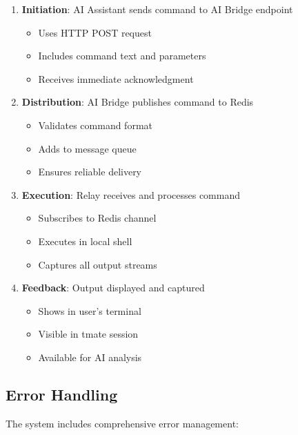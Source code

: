 \documentclass{article}
\begin{document}
\begin{enumerate}
    \item \textbf{Initiation}: AI Assistant sends command to AI Bridge endpoint
    \begin{itemize}
        \item Uses HTTP POST request
        \item Includes command text and parameters
        \item Receives immediate acknowledgment
    \end{itemize}
    
    \item \textbf{Distribution}: AI Bridge publishes command to Redis
    \begin{itemize}
        \item Validates command format
        \item Adds to message queue
        \item Ensures reliable delivery
    \end{itemize}
    
    \item \textbf{Execution}: Relay receives and processes command
    \begin{itemize}
        \item Subscribes to Redis channel
        \item Executes in local shell
        \item Captures all output streams
    \end{itemize}
    
    \item \textbf{Feedback}: Output displayed and captured
    \begin{itemize}
        \item Shows in user's terminal
        \item Visible in tmate session
        \item Available for AI analysis
    \end{itemize}
\end{enumerate}

\subsection{Error Handling}
The system includes comprehensive error management:
\end{document}
